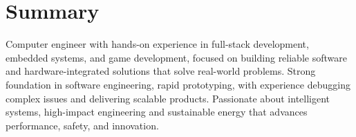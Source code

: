 \section{Summary}
Computer engineer with hands-on experience in full-stack development, embedded systems, and game development, focused on building reliable software and hardware-integrated solutions that solve real-world problems. Strong foundation in software engineering, rapid prototyping, with experience debugging complex issues and delivering scalable products. Passionate about intelligent systems, high-impact engineering and sustainable energy that advances performance, safety, and innovation.